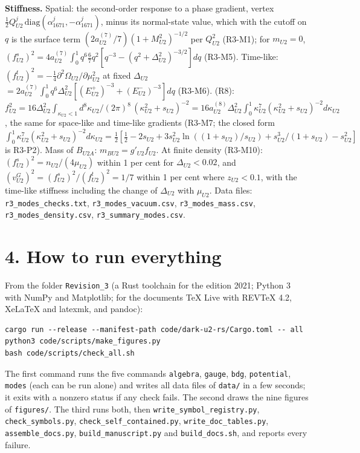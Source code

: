 \documentclass[
  10pt,
]{article}
\begin{document}
\textbf{Stiffness.} Spatial: the second-order response to a phase
gradient, vertex
\(\tfrac12Q^j_{U2}\,\mathrm{diag}(\alpha^j_{1671},-\alpha^j_{1671})\),
minus its normal-state value, which with the cutoff on \(q\) is the
surface term \((2a^{(7)}_{U2}/7)(1+M^2_{U2})^{-1/2}\) per \(Q^2_{U2}\)
(R3-M1); for \(m_{U2}=0\),
\((f^s_{U2})^2=4a^{(7)}_{U2}\int_0^1q^6\tfrac67q^2[q^{-3}-(q^2+\Delta^2_{U2})^{-3/2}]dq\)
(R3-M5). Time-like:
\((f^t_{U2})^2=-\tfrac14\partial^2\Omega_{U2}/\partial\mu^2_{U2}\) at
fixed \(\Delta_{U2}\)
\(=2a^{(7)}_{U2}\int_0^1q^6\Delta^2_{U2}[(E^+_{U2})^{-3}+(E^-_{U2})^{-3}]dq\)
(R3-M6). (R8):
\(f^2_{U2}=16\Delta^2_{U2}\int_{\kappa_{U2}<1}d^8\kappa_{U2}/(2\pi)^8\,(\kappa^2_{U2}+s_{U2})^{-2} =16a^{(8)}_{U2}\Delta^2_{U2}\int_0^1\kappa^7_{U2}(\kappa^2_{U2}+s_{U2})^{-2}d\kappa_{U2}\),
the same for space-like and time-like gradients (R3-M7; the closed form
\(\int_0^1\kappa^7_{U2}(\kappa^2_{U2}+s_{U2})^{-2}d\kappa_{U2}=\tfrac12[\tfrac12-2s_{U2}+3s^2_{U2}\ln((1+s_{U2})/s_{U2})+s^3_{U2}/(1+s_{U2})-s^2_{U2}]\)
is R3-P2). Mass of \(B_{U2A}\): \(m_{BU2}=g'_{U2}f_{U2}\). At finite
density (R3-M10): \((f^s_{U2})^2=n_{U2}/(4\mu_{U2})\) within 1 per cent
for \(\Delta_{U2}<0.02\), and
\((v^G_{U2})^2=(f^s_{U2})^2/(f^t_{U2})^2=1/7\) within 1 per cent where
\(z_{U2}<0.1\), with the time-like stiffness including the change of
\(\Delta_{U2}\) with \(\mu_{U2}\). Data files:
\texttt{r3\_modes\_checks.txt}, \texttt{r3\_modes\_vacuum.csv},
\texttt{r3\_modes\_mass.csv}, \texttt{r3\_modes\_density.csv},
\texttt{r3\_summary\_modes.csv}.

\hypertarget{how-to-run-everything}{%
\section{4. How to run everything}\label{how-to-run-everything}}

From the folder \texttt{Revision\_3} (a Rust toolchain for the edition
2021; Python 3 with NumPy and Matplotlib; for the documents TeX Live
with REVTeX 4.2, XeLaTeX and latexmk, and pandoc):

\begin{verbatim}
cargo run --release --manifest-path code/dark-u2-rs/Cargo.toml -- all
python3 code/scripts/make_figures.py
bash code/scripts/check_all.sh
\end{verbatim}

The first command runs the five commands \texttt{algebra},
\texttt{gauge}, \texttt{bdg}, \texttt{potential}, \texttt{modes} (each
can be run alone) and writes all data files of \texttt{data/} in a few
seconds; it exits with a nonzero status if any check fails. The second
draws the nine figures of \texttt{figures/}. The third runs both, then
\texttt{write\_symbol\_registry.py}, \texttt{check\_symbols.py},
\texttt{check\_self\_contained.py}, \texttt{write\_doc\_tables.py},
\texttt{assemble\_docs.py}, \texttt{build\_manuscript.py} and
\texttt{build\_docs.sh}, and reports every failure.
\end{document}

